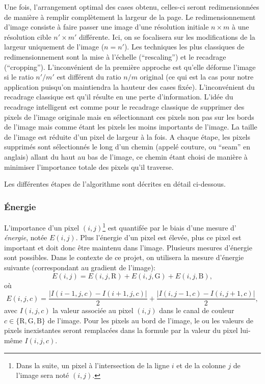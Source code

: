 \documentclass[a4paper,10pt]{article}
\begin{document}
Une fois, l'arrangement optimal des cases obtenu, celles-ci seront
redimensionnées de manière à remplir complètement la largeur de la
page. Le redimensionnement d'image consiste à faire passer une image
d'une résolution initiale $n\times m$ à une résolution cible $n'\times
m'$ différente. Ici, on se focalisera sur les modifications de la
largeur uniquement de l'image ($n=n'$). Les techniques les plus
classiques de redimensionnement sont la mise à l'échelle
(``rescaling'') et le recadrage (``cropping''). L'inconvénient de la
première approche est qu'elle déforme l'image si le ratio $n'/m'$ est
différent du ratio $n/m$ original (ce qui est la cas pour notre
application puisqu'on maintiendra la hauteur des cases
fixée). L'inconvénient du recadrage classique est qu'il résulte en une
perte d'information. L'idée du recadrage intelligent est comme pour le
recadrage classique de supprimer des pixels de l'image originale mais
en sélectionnant ces pixels non pas sur les bords de l'image mais
comme étant les pixels les moins importants de l'image. La taille de
l'image est réduite d'un pixel de largeur à la fois. A chaque étape,
les pixels supprimés sont sélectionnés le long d'un chemin (appelé
couture, ou ``seam'' en anglais) allant du haut au bas de l'image, ce
chemin étant choisi de manière à minimiser l'importance totale des
pixels qu'il traverse.

Les différentes étapes de l'algorithme sont décrites en détail
ci-dessous.

\subsubsection{\'Energie}

L'importance d'un pixel $(i,j)$\footnote{Dans la suite, un pixel à
  l'intersection de la ligne $i$ et de la colonne $j$ de l'image sera
  noté $(i,j)$.} est quantifée par le biais d'une mesure d'{\it
  énergie}, notée $E(i,j)$. Plus l'énergie d'un pixel est élevée, plus
ce pixel est important et doit donc être maintenu dans l'image. Plusieurs
mesures d'énergie sont possibles. Dans le contexte de ce projet, on
utilisera la mesure d'énergie suivante (correspondant au gradient de
l'image):
$$E(i,j)=E(i,j,\mbox{R})+E(i,j,\mbox{G})+E(i,j,\mbox{B}),$$
où
$$E(i,j,c)= \frac{|I(i-1,j,c)-I(i+1,j,c)|}{2} +
\frac{|I(i,j-1,c)-I(i,j+1,c)|}{2},$$ avec $I(i,j,c)$ la valeur associée
au pixel $(i,j)$ dans le canal de couleur $c\in\{\mbox{R},\mbox{G},\mbox{B}\}$ de
l'image. Pour les pixels au bord de l'image, le ou les valeurs de
pixels inexistantes seront remplacées dans la formule par la valeur du
pixel lui-même $I(i,j,c)$.
\end{document}
